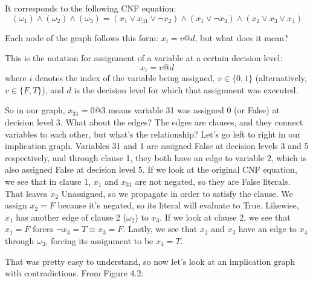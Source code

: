 \documentclass[oneside]{book}
\begin{document}
It corresponds to the following CNF equation: 
$$ (\omega_1) \wedge (\omega_2) \wedge (\omega_3) =
(x_1 \vee x_{31} \vee \neg x_2) \wedge (x_1 \vee \neg x_3) \wedge (x_2 \vee x_3 \vee x_4)$$

Each node of the graph follows this form: $x_i = v @ d$, but what does it mean?

\begin{center}
    This is the notation for assignment of a variable at a certain decision level:
    $$x_i = v@d$$
    where $i$ denotes the index of the variable being assigned, $v \in \{0, 1\}$
    (alternatively, $v \in \{F, T\}$), and $d$ is the decision level for which that 
    assignment was executed.
\end{center}

So in our graph, $x_{31} = 0 @ 3$ means variable 31 was assigned 0 (or False) at
decision level 3. What about the edges? The edges are clauses, and they connect
variables to each other, but what's the relationship? Let's go left to right in our 
implication graph. Variables 31 and 1 are assigned False at decision levels 3 and 5
respectively, and through clause 1, they both have an edge to variable 2, which is also 
assigned False at decision level 5. If we look at the original CNF equation, we see that 
in clause 1, $x_1$ and $x_{31}$ are not negated, so they are False literals. That leaves 
$x_2$ Unassigned, so we propagate in order to satisfy the clause. We assign $x_2 = F$ 
because it's negated, so its literal will evaluate to True. Likewise, $x_1$ has another 
edge of clause 2 ($\omega_2$) to $x_3$. If we look at clause 2, we see that $x_1 = F$ 
forces $\neg x_3 = T \equiv x_3 = F$. Lastly, we see that $x_2$ and $x_3$ have an edge 
to $x_4$ through $\omega_3$, forcing its assignment to be $x_4 = T$.

That was pretty easy to understand, so now let's look at an implication graph with 
contradictions. From Figure 4.2:
\end{document}
